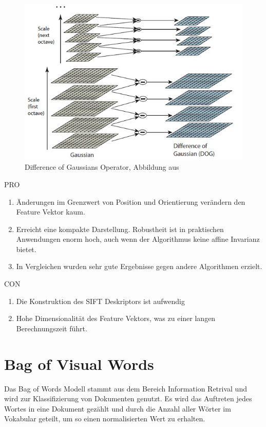 \begin{figure}
	\centering
	\includegraphics[scale=0.7]{images/dog.png}
	\caption{Difference of Gaussians Operator, Abbildung aus \cite{dif2004}}
	\label{img:sift_dog}
\end{figure}

PRO

\begin{enumerate}
	\item Änderungen im Grenzwert von Position und Orientierung verändern den Feature Vektor kaum.
	\item Erreicht eine kompakte Darstellung. Robustheit ist in praktischen Anwendungen enorm hoch, auch wenn der Algorithmus keine affine Invarianz bietet.
	\item In Vergleichen wurden sehr gute Ergebnisse gegen andere Algorithmen erzielt.
\end{enumerate}

CON

\begin{enumerate}
	\item Die Konstruktion des SIFT Deskriptors ist aufwendig
	\item Hohe Dimensionalität des Feature Vektors, was zu einer langen Berechnungszeit führt.
\end{enumerate}

\section{Bag of Visual Words}

Das Bag of Words Modell stammt aus dem Bereich Information Retrival und wird zur Klassifizierung von Dokumenten genutzt. Es wird das Auftreten jedes Wortes in eine Dokument gezählt und durch die Anzahl aller Wörter im Vokabular geteilt, um so einen normalisierten Wert zu erhalten.

